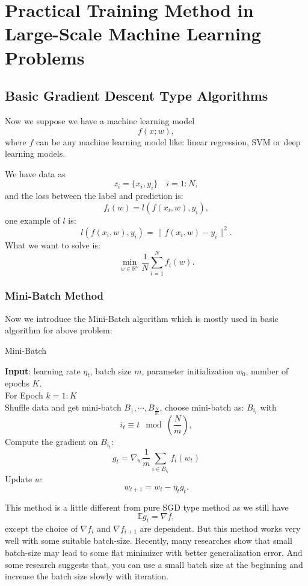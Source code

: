 \section{Practical Training Method
 in Large-Scale Machine Learning Problems}

\subsection{Basic Gradient Descent Type Algorithms}
Now we suppose we have a machine learning model
\begin{equation}
f(x; w),
\end{equation}
where $f$ can be any machine learning model like: linear regression, SVM or deep learning models. 

We have data as 
$$
z_i=\{x_i, y_i\}\quad i = 1:N,
$$
and the loss between the label and prediction is:
$$
f_i(w) = l(f(x_i, w), y_i),
$$
one example of $l$ is:
$$
l(f(x_i, w), y_i) = \|f(x_i, w)- y_i\|^2.
$$
What we want to solve is:
\begin{equation}
\mathop{\min}_{{w} \in \mathbb{R}^{n}} \frac{1}{N}\sum_{i=1}^N f_i(w).
\end{equation}

\subsubsection{Mini-Batch Method}
Now we introduce the Mini-Batch algorithm which is mostly used in basic algorithm for above problem:
\begin{algorithm}[H]
\caption{Mini-Batch}
\label{alg:mini-batch}
{\bf Input}: learning rate $\eta_t$, batch size $m$, parameter initialization $ w_0$, number of epochs $K$. \\
For Epoch $k = 1:K$\\
Shuffle data and get mini-batch $B_1, \cdots, B_{\frac{N}{m}}$, choose mini-batch as: $B_{i_t}$ with
$$
i_t \equiv t \mod(\frac{N}{m}),
$$
Compute the gradient on $B_{i_t}$:
$$
g_t = \nabla_{w} \frac{1}{m} \sum_{i \in B_{i_t}} f_i(w_{t})
$$
Update $w$:
\begin{equation}
w_{t+1} = w_t - \eta_t g_t.
\end{equation}
\end{algorithm}

This method is a little different from pure SGD type method as we still have
$$
\mathbb{E} g_t = \nabla f,
$$
except  the choice of $\nabla f_i$ and $\nabla f_{i+1}$ are dependent.
But this method works very well with some suitable batch-size. Recently, many researches show that small batch-size may lead to some flat minimizer with better generalization error. And some research suggests that, you can use a small batch size at the beginning and increase the batch size slowly with iteration.



